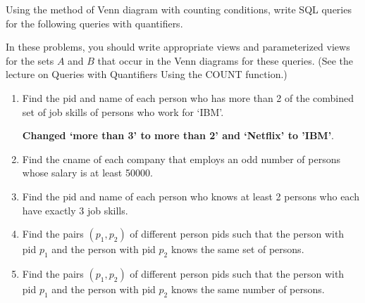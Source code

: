 \documentclass{article}
\begin{document}
Using the method of Venn diagram with counting conditions, write SQL queries for 
the following queries with quantifiers.

In these problems, you should write appropriate views and parameterized views for the sets $A$ and $B$
that occur in the Venn diagrams for these queries.  (See the lecture on Queries with Quantifiers Using the COUNT function.)

\begin{enumerate}[resume]
\item Find the pid and name of each person who has more than 2 of the combined set of job skills of
persons who work for `IBM'.

{\bf Changed `more than 3' to more than 2' and `Netflix' to 'IBM'}.

\item Find the cname of each company that employs an odd number of persons whose salary is at least 50000.
\item Find the pid and name of each person who knows at least 2 persons who each have exactly 3 job skills.
\item Find the pairs $(p_1,p_2)$ of different person pids such that the person with pid $p_1$ and the
person with pid $p_2$ knows the same set of persons.
\item Find the pairs $(p_1,p_2)$ of different person pids such that the person with pid $p_1$ and
the person with pid $p_2$ knows the same number of persons.
\end{enumerate}
\newpage
\end{document}
